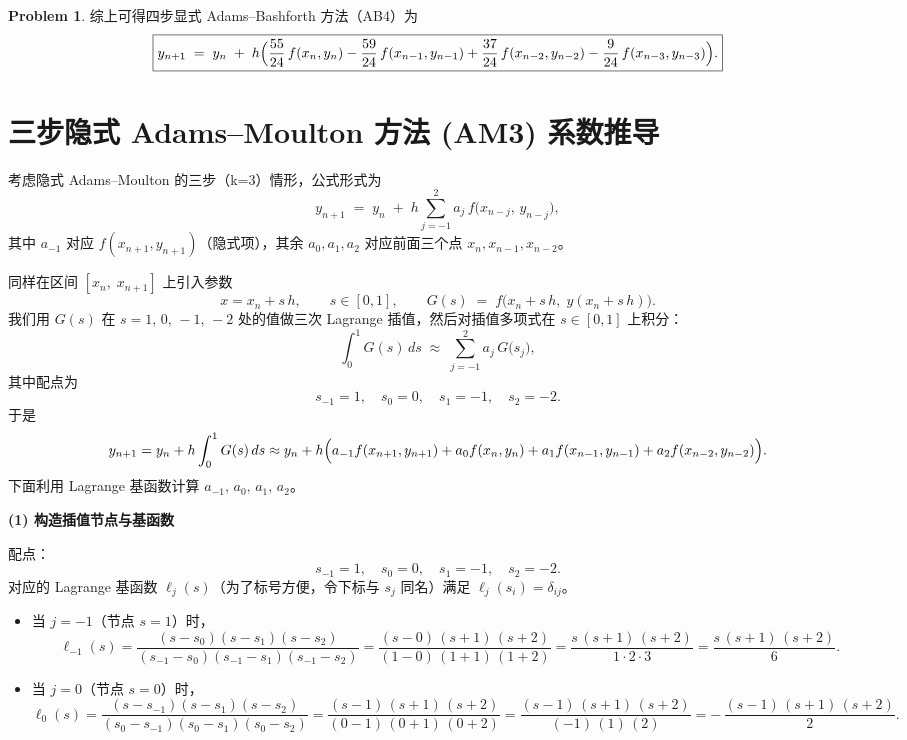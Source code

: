 \documentclass[a4paper]{article}
\theoremstyle{definition}
\newtheorem{problem}{Problem}
\theoremstyle{plain}
\newcommand{\<}{\left<}
\renewcommand{\>}{\right>}
\numberwithin{equation}{problem}
\begin{document}
\begin{problem}
综上可得四步显式 Adams–Bashforth 方法（AB4）为
\[
\boxed{
y_{n+1} \;=\; y_n 
\;+\; h \Bigl(
   \frac{55}{24}\,f(x_n,y_n)
 - \frac{59}{24}\,f(x_{n-1},y_{n-1})
 + \frac{37}{24}\,f(x_{n-2},y_{n-2})
 - \frac{9}{24}\,f(x_{n-3},y_{n-3})
\Bigr).
}
\]

\bigskip
\section*{三步隐式 Adams–Moulton 方法 (AM3) 系数推导}

考虑隐式 Adams–Moulton 的三步（k=3）情形，公式形式为
\[
y_{n+1} \;=\; y_n \;+\; h \sum_{j=-1}^{2} a_j \, f\bigl(x_{n-j},\,y_{n-j}\bigr),
\]
其中 $a_{-1}$ 对应 $f(x_{n+1},y_{n+1})$（隐式项），其余 $a_0,a_1,a_2$ 对应前面三个点 $x_n,x_{n-1},x_{n-2}$。  

同样在区间 $[x_n,\;x_{n+1}]$ 上引入参数
\[
x = x_n + s\,h,\qquad s \in [0,1],
\qquad 
G(s) \;=\; f\bigl(x_n + s\,h,\;y(x_n + s\,h)\bigr).
\]
我们用 $G(s)$ 在 $s = 1,\,0,\,-1,\,-2$ 处的值做三次 Lagrange 插值，然后对插值多项式在 $s\in[0,1]$ 上积分：
\[
\int_{0}^{1} G(s)\,ds
\;\approx\;
\sum_{j = -1}^{2} a_j \, G\bigl(s_j\bigr),
\]
其中配点为
\[
s_{-1} = 1,\quad s_0 = 0,\quad s_1 = -1,\quad s_2 = -2.
\]
于是
\[
y_{n+1} 
= y_n 
+ h \int_{0}^{1} G(s)\,ds
\approx
y_n 
+ h \Bigl(
  a_{-1} f(x_{n+1},y_{n+1})
+ a_{0} f(x_{n},y_{n})
+ a_{1} f(x_{n-1},y_{n-1})
+ a_{2} f(x_{n-2},y_{n-2})
\Bigr).
\]
下面利用 Lagrange 基函数计算 $a_{-1},\,a_0,\,a_1,\,a_2$。

\medskip

\noindent\textbf{(1) 构造插值节点与基函数}  

配点：
\[
s_{-1} = 1,\quad s_{0} = 0,\quad s_{1} = -1,\quad s_{2} = -2.
\]
对应的 Lagrange 基函数 $\ell_j(s)$（为了标号方便，令下标与 $s_j$ 同名）满足 $\ell_j(s_i) = \delta_{ij}$。  

\begin{itemize}
  \item 当 $j = -1$（节点 $s = 1$）时，
    \[
    \ell_{-1}(s)
    = \frac{(s - s_0)(s - s_1)(s - s_2)}
           {(s_{-1} - s_0)(s_{-1} - s_1)(s_{-1} - s_2)}
    = \frac{(s - 0)\,(s + 1)\,(s + 2)}
           {(1 - 0)\,(1 + 1)\,(1 + 2)}
    = \frac{s\,(s + 1)\,(s + 2)}{1 \cdot 2 \cdot 3}
    = \frac{s\,(s + 1)\,(s + 2)}{6}.
    \]
  
  \item 当 $j = 0$（节点 $s = 0$）时，
    \[
    \ell_{0}(s)
    = \frac{(s - s_{-1})(s - s_{1})(s - s_{2})}
           {(s_{0} - s_{-1})(s_{0} - s_{1})(s_{0} - s_{2})}
    = \frac{(s - 1)\,(s + 1)\,(s + 2)}
           {(0 - 1)\,(0 + 1)\,(0 + 2)}
    = \frac{(s - 1)\,(s + 1)\,(s + 2)}{(-1)\,(1)\,(2)}
    = -\,\frac{(s - 1)\,(s + 1)\,(s + 2)}{2}.
    \]
  

\end{itemize}
\end{problem}
\end{document}

